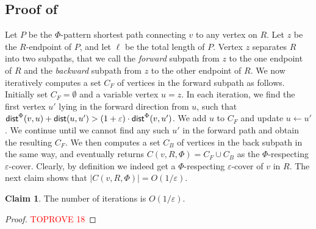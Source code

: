 \documentclass[11pt]{article}
\theoremstyle{definition}
\newtheorem{claim}[theorem]{Claim}
\newcommand{\eps}{{\varepsilon}}
\newcommand{\dist}{\textnormal{\textsf{dist}}}
\begin{document}
\subsection{Proof of }
\label{apd: Proof of lem: pattern cover}

Let $P$ be the $\Phi$-pattern shortest path connecting $v$ to any vertex on $R$. Let $z$ be the $R$-endpoint of $P$, and let $\ell$ be the total length of $P$.
Vertex $z$ separates $R$ into two subpaths, that we call the \emph{forward} subpath from $z$ to the one endpoint of $R$ and the \emph{backward} subpath from $z$ to the other endpoint of $R$.
We now iteratively computes a set $C_F$ of vertices in the forward subpath as follows.
Initially set $C_F=\emptyset$ and a variable vertex $u=z$. In each iteration, we find the first vertex $u'$ lying in the forward direction from $u$, such that 
$\dist^{\Phi}(v,u)+\dist(u,u')> (1+\eps)\cdot \dist^{\Phi}(v,u')$. We add $u$ to $C_F$ and update $u\leftarrow u'$. We continue until we cannot find any such $u'$ in the forward path and obtain the resulting $C_F$.
We then computes a set $C_B$ of vertices in the back subpath in the same way, and eventually returns $C(v,R,\Phi)=C_F\cup C_B$ as the $\Phi$-respecting $\eps$-cover.
Clearly, by definition we indeed get a $\Phi$-respecting $\eps$-cover of $v$ in $R$. The next claim shows that $|C(v,R,\Phi)|=O(1/\eps)$.

\begin{claim}
The number of iterations  is $O(1/\eps)$.
\end{claim}
\begin{proof}\textcolor{red}{TOPROVE 18}\end{proof}





 




\end{document}
